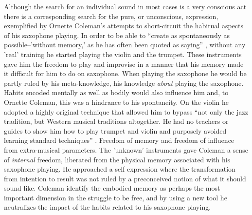 \documentclass[a4paper]{article}
\begin{document}



Although the search for an individual sound in most cases is a very conscious act there is a corresponding search for the pure, or unconscious, expression, exemplified by Ornette Coleman's attempts to short-circuit the habitual aspects of his saxophone playing. In order to be able to ``create as spontaneously as possible--'without memory,' as he has often been quoted as saying'' \citet[p. 117]{litzweiler92}, without any 'real' training he started playing the violin and the trumpet. These instruments gave him the freedom to play and improvise in a manner that his memory made it difficult for him to do on saxophone. When playing the saxophone he would be partly ruled by his meta-knowledge, his knowledge \emph{about} playing the saxophone. Habits encoded mentally as well as bodily would also influence him and, to Ornette Coleman, this was a hindrance to his spontaneity. On the violin he adopted a highly original technique that allowed him to bypass ``not only the jazz tradition, but Western musical traditions altogether. He had no teachers or guides to show him how to play trumpet and violin and purposely avoided learning standard techniques'' \citet[p. 117]{litzweiler92}. Freedom of memory and freedom of influence from extra-musical parameters. The 'unknown' instruments gave Coleman a sense of \emph{internal} freedom, liberated from the physical memory associated with his saxophone playing. He approached a self expression where the transformation from intention to result was not ruled by a preconceived notion of what it should sound like. Coleman identify the embodied memory as perhaps the most important dimension in the struggle to be free, and by using a new tool he neutralizes the impact of the habits related to his saxophone playing.
\end{document}
